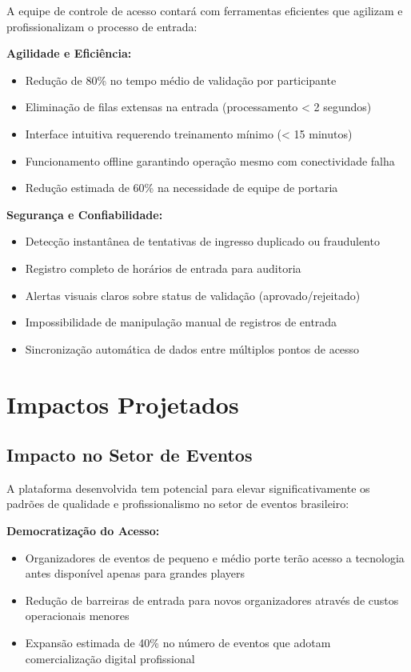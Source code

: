 A equipe de controle de acesso contará com ferramentas eficientes que agilizam e profissionalizam o processo de entrada:

\textbf{Agilidade e Eficiência:}
\begin{itemize}
    \item Redução de 80\% no tempo médio de validação por participante
    \item Eliminação de filas extensas na entrada (processamento < 2 segundos)
    \item Interface intuitiva requerendo treinamento mínimo (< 15 minutos)
    \item Funcionamento offline garantindo operação mesmo com conectividade falha
    \item Redução estimada de 60\% na necessidade de equipe de portaria
\end{itemize}

\textbf{Segurança e Confiabilidade:}
\begin{itemize}
    \item Detecção instantânea de tentativas de ingresso duplicado ou fraudulento
    \item Registro completo de horários de entrada para auditoria
    \item Alertas visuais claros sobre status de validação (aprovado/rejeitado)
    \item Impossibilidade de manipulação manual de registros de entrada
    \item Sincronização automática de dados entre múltiplos pontos de acesso
\end{itemize}

\section{Impactos Projetados}

\subsection{Impacto no Setor de Eventos}

A plataforma desenvolvida tem potencial para elevar significativamente os padrões de qualidade e profissionalismo no setor de eventos brasileiro:

\textbf{Democratização do Acesso:}
\begin{itemize}
    \item Organizadores de eventos de pequeno e médio porte terão acesso a tecnologia antes disponível apenas para grandes players
    \item Redução de barreiras de entrada para novos organizadores através de custos operacionais menores
    \item Expansão estimada de 40\% no número de eventos que adotam comercialização digital profissional
\end{itemize}

